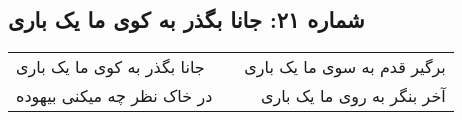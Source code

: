 \begin{center}
\section*{شماره ۲۱: جانا بگذر به کوی ما یک باری}
\label{sec:021}
\begin{longtable}{l p{0.5cm} r}
جانا بگذر به کوی ما یک باری
&&
برگیر قدم به سوی ما یک باری
\\
در خاک نظر چه میکنی بیهوده
&&
آخر بنگر به روی ما یک باری
\\
\end{longtable}
\end{center}
